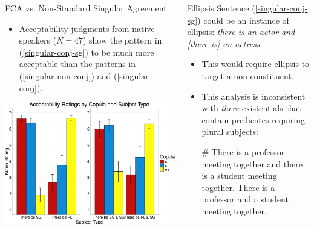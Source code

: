 \documentclass[final]{beamer}
\newlength{\onecolwid}
\newlength{\twocolwid}
\begin{document}
\begin{frame}[t]
\begin{columns}[t]
\begin{column}{\twocolwid}
\begin{columns}[t,totalwidth=\twocolwid]
\begin{column}{\onecolwid}
\begin{block}{FCA vs. Non-Standard Singular Agreement}
\begin{itemize}
\item Acceptability judgments from native speakers (\(N = 47\)) show the pattern in (\ref{singular-conj-sg}) to be much more acceptable than the patterns in (\ref{singular-non-conj}) and  (\ref{singular-conj}).
\end{itemize}
\vspace{1em}
\includegraphics[width=\onecolwid]{Plot-color.eps}

\end{block}

\end{column} %

\begin{column}{\onecolwid}\vspace{-.6in} %

\begin{block}{Ellipsis}\vspace{0.5em}
Sentence (\ref{singular-conj-sg}) could be an instance of ellipsis: \textit{there is an actor and [\sout{there is}] an actress}.
\begin{itemize}
\item This would require ellipsis to target a non-constituent.
\item This analysis is inconsistent with \textit{there} existentials that contain predicates requiring plural subjects:
\begin{exe}
\ex\label{ellipsis-full1} \# There is a professor meeting together and there is a student meeting together.
\ex\label{ellipsis-elided} There is a professor and a student meeting together.
\end{exe}


\end{itemize}
\end{block}
\end{column}
\end{columns}
\end{column}
\end{columns}
\end{frame}
\end{document}
